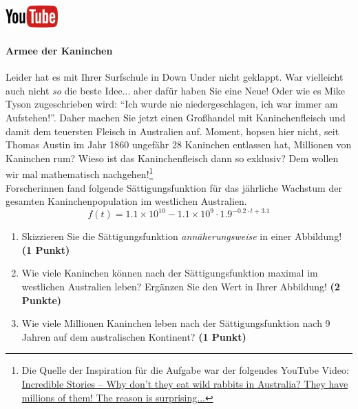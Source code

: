 \documentclass[a4paper, 9pt]{scrartcl}\usepackage[]{graphicx}\usepackage[]{xcolor}
\begin{document}
\hfill\href{https://youtu.be/Mr6eslls4J0}{\includegraphics[width =
  2cm]{img/youtube}} %
\hspace{2Ex}

\paragraph{Armee der Kaninchen}



Leider hat es mit Ihrer Surfschule in Down Under nicht geklappt. War vielleicht
auch nicht \textit{so} die beste Idee... aber daf{\"u}r haben Sie eine Neue!
Oder wie es Mike Tyson zugeschrieben wird: "`Ich wurde nie
niedergeschlagen, ich war immer am Aufstehen!"'. Daher machen Sie jetzt
einen Gro{\ss}handel mit Kaninchenfleisch und damit dem teuersten Fleisch in
Australien auf. Moment, hopsen hier nicht, seit Thomas Austin im Jahr
1860 ungef{\"a}hr 28 Kaninchen entlassen hat,
Millionen von Kaninchen rum? Wieso ist das Kaninchenfleisch dann so
exklusiv? Dem wollen wir mal mathematisch nachgehen!\footnote{Die Quelle
  der Inspiration f{\"u}r die Aufgabe war der folgendes YouTube Video:
  \href{https://youtu.be/38fuOr3tdgc?si=Li7NL_FoByML8JtT}{ Incredible
    Stories -- Why don't they eat wild rabbits in Australia? They have
    millions of them! The reason is surprising...}}
\\

Forscherinnen fand folgende S{\"a}ttigungsfunktion f{\"u}r das j{\"a}hrliche Wachstum
der gesamten Kaninchenpopulation im westlichen Australien.
\begin{equation*}
  f(t) = \ensuremath{1.1\times 10^{10}} - \ensuremath{1.1\times 10^{9}} \cdot 1.9^{-0.2 \cdot t + 3.1}
\end{equation*}

\begin{enumerate}
\item Skizzieren Sie die S{\"a}ttigungsfunktion \textit{ann{\"a}herungsweise} in einer Abbildung! \textbf{(1
    Punkt)}
\item Wie viele Kaninchen k{\"o}nnen nach der S{\"a}ttigungsfunktion maximal im
  westlichen Australien leben? Erg{\"a}nzen Sie den Wert in Ihrer Abbildung! \textbf{(2 Punkte)}
\item Wie viele Millionen Kaninchen leben nach der S{\"a}ttigungsfunktion
  nach 9 Jahren auf dem australischen Kontinent? \textbf{(1
    Punkt)}
\end{enumerate}
\end{document}
